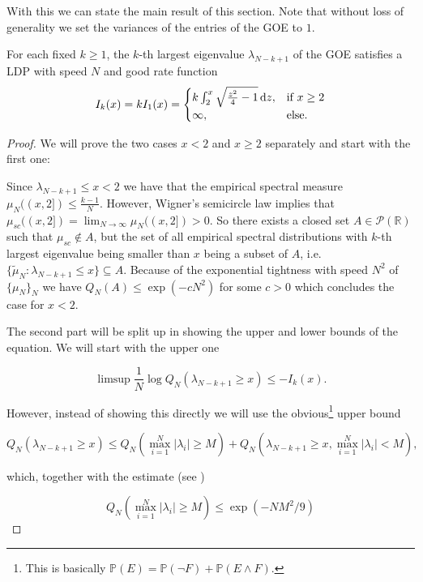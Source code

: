 With this we can state the main result of this section. Note that without loss of generality we set the variances of the entries of the GOE to $1$.
\begin{theorem}
	For each fixed $k\geq 1$, the $k$-th largest eigenvalue $\lambda_{N-k+1}$ of the GOE satisfies a LDP with speed $N$ and good rate function
	$$I_k(x)=kI_1(x)=\begin{cases}
						k\int_2^x\sqrt{\frac{z^2}{4}-1}\mathop{}\!\mathrm{d} z, &\mbox{if } x\geq 2 \\
						\infty, &\mbox{else.}
					  \end{cases}$$
\end{theorem}
\begin{proof}
	We will prove the two cases $x<2$ and $x\geq 2$ separately and start with the first one:
	
	Since $\lambda_{N-k+1}\leq x<2$ we have that the empirical spectral measure $\mu_N((x,2])\leq \frac{k-1}{N}$. However, Wigner's semicircle law implies that $\mu_{sc}((x,2])=\lim_{N\rightarrow\infty} \mu_N((x,2])>0$. So there exists a closed set $A\in\mathcal P(\mathbb R)$ such that $\mu_{sc}\notin A$, but the set of all empirical spectral distributions with $k$-th largest eigenvalue being smaller than $x$ being a subset of $A$, i.e. $\{\tilde \mu_N:\lambda_{N-k+1}\leq x\}\subseteq A$. Because of the exponential tightness with speed $N^2$ of $\{\mu_N\}_N$ we have $Q_N(A)\leq\exp(-cN^2)$ for some $c>0$ which concludes the case for $x<2$.
	
	The second part will be split up in showing the upper and lower bounds of the equation. We will start with the upper one
	
	\begin{equation}\label{eq:LDPlargestEVupperbound}
		\limsup \frac{1}{N}\log Q_N(\lambda_{N-k+1}\geq x)\leq -I_k(x).
	\end{equation}
	
	However, instead of showing this directly we will use the obvious\footnote{This is basically $\mathbb P(E)=\mathbb P(\neg F)+\mathbb P(E\land F)$.} upper bound
	
	$$Q_N(\lambda_{N-k+1}\geq x)\leq Q_N(\max_{i=1}^N |\lambda_i|\geq M)+ Q_N(\lambda_{N-k+1}\geq x,\max_{i=1}^N|\lambda_i|<M),$$
	
	which, together with the estimate (see \cite{ArousAging})
	
	\begin{equation}\label{eq:maxEVinequality}
		Q_N(\max_{i=1}^N|\lambda_i|\geq M)\leq \exp(-NM^2/9)
	\end{equation}
	

\end{proof}
